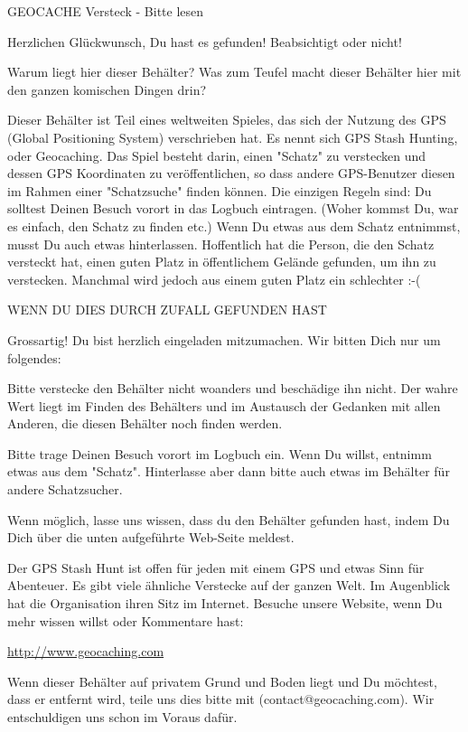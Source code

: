 GEOCACHE Versteck - Bitte lesen

Herzlichen Glückwunsch, Du hast es gefunden! Beabsichtigt oder nicht!

Warum liegt hier dieser Behälter? Was zum Teufel macht dieser Behälter hier mit den ganzen komischen Dingen drin?

Dieser Behälter ist Teil eines weltweiten Spieles, das sich der Nutzung des GPS (Global Positioning System) verschrieben hat. Es nennt sich GPS Stash Hunting, oder Geocaching. Das Spiel besteht darin, einen "Schatz" zu verstecken und dessen GPS Koordinaten zu veröffentlichen, so dass andere GPS-Benutzer diesen im Rahmen einer "Schatzsuche" finden können. 
Die einzigen Regeln sind: 
Du solltest Deinen Besuch vorort in das Logbuch eintragen. (Woher kommst Du, war es einfach, den Schatz zu finden etc.)
Wenn Du etwas aus dem Schatz entnimmst, musst Du auch etwas hinterlassen.
Hoffentlich hat die Person, die den Schatz versteckt hat, einen guten Platz in öffentlichem Gelände gefunden, um ihn zu verstecken. 
Manchmal wird jedoch aus einem guten Platz ein schlechter :-(

WENN DU DIES DURCH ZUFALL GEFUNDEN HAST

Grossartig! Du bist herzlich eingeladen mitzumachen. Wir bitten Dich nur um folgendes:
\begin{itemize*}
	\item Bitte verstecke den Behälter nicht woanders und beschädige ihn nicht. Der wahre Wert liegt im Finden des Behälters und im Austausch der Gedanken mit allen Anderen, die diesen Behälter noch finden werden.
	\item Bitte trage Deinen Besuch vorort im Logbuch ein. Wenn Du willst, entnimm etwas aus dem "Schatz". Hinterlasse aber dann bitte auch etwas im Behälter für andere Schatzsucher.
	\item Wenn möglich, lasse uns wissen, dass du den Behälter gefunden hast, indem Du Dich über die unten aufgeführte Web-Seite meldest.
\end{itemize*}
Der GPS Stash Hunt ist offen für jeden mit einem GPS und etwas Sinn für Abenteuer. Es gibt viele ähnliche Verstecke auf der ganzen Welt. Im Augenblick hat die Organisation ihren Sitz im Internet. Besuche unsere Website, wenn Du mehr wissen willst oder Kommentare hast:

\url{http://www.geocaching.com}

Wenn dieser Behälter auf privatem Grund und Boden liegt und Du möchtest, dass er entfernt wird, teile uns dies bitte mit (contact@geocaching.com). 
Wir entschuldigen uns schon im Voraus dafür.


